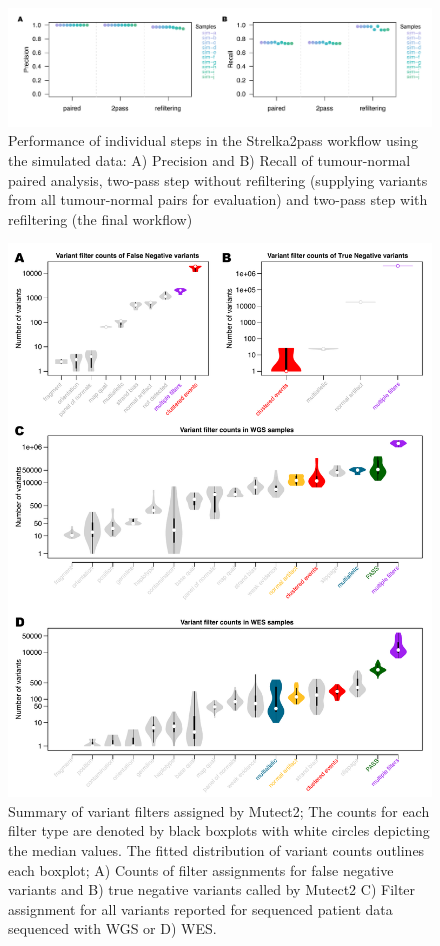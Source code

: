 \begin{figure}[!ht]
\centering
  \includegraphics[width=\textwidth]{Appendices/Variantcalling/supp/S4}
  \caption[Performance of individual steps in the Strelka2pass workflow using the simulated data]{Performance of individual steps in the Strelka2pass workflow using the simulated data: A) Precision and B) Recall of tumour-normal paired analysis, two-pass step without refiltering (supplying variants from all tumour-normal pairs for evaluation) and two-pass step with refiltering (the final workflow)}\label{A:fig:S04}
\end{figure}

\begin{figure}[!ht]
\centering
  \includegraphics[width=\textwidth]{Appendices/Variantcalling/supp/S5}
  \caption[Summary of variant filters assigned by Mutect2]{Summary of variant filters assigned by Mutect2; The counts for each filter type are denoted by black boxplots with white circles depicting the median values. The fitted distribution of variant counts outlines each boxplot; A) Counts of filter assignments for false negative variants and B) true negative variants called by Mutect2 C) Filter assignment for all variants reported for sequenced patient data sequenced with WGS or D) WES.}\label{A:fig:S05}
\end{figure}

